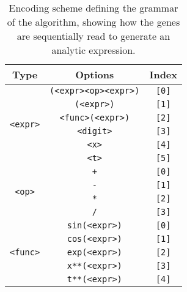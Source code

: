 \documentclass[multicolumn, 12pt]{extarticle}
\begin{document}
\begin{table}[h]
\centering
    \caption{Encoding scheme defining the grammar of the algorithm, showing how the genes are sequentially read to generate an analytic expression.}
    \label{tab:grammar}  
        \begin{tabular}{ccc}
        \toprule
        Type & Options & Index \\
        \midrule
             
             \multirow{6}{*}{\texttt{<expr>}} 
             		& \multicolumn{1}{c}{\texttt{(<expr><op><expr>)}} & \multicolumn{1}{c}{\texttt{[0]}} \\
                                & \multicolumn{1}{c}{\texttt{(<expr>)}} & \multicolumn{1}{c}{\texttt{[1]}} \\
                                & \multicolumn{1}{c}{\texttt{<func>(<expr>)}} & \multicolumn{1}{c}{\texttt{[2]}} \\
                                & \multicolumn{1}{c}{\texttt{<digit>}} & \multicolumn{1}{c}{\texttt{[3]}} \\
                                & \multicolumn{1}{c}{\texttt{<x>}} & \multicolumn{1}{c}{\texttt{[4]}} \\
                                & \multicolumn{1}{c}{\texttt{<t>}} & \multicolumn{1}{c}{\texttt{[5]}} \\                        
                                 
	\midrule
        
            \multirow{4}{*}{\texttt{<op>}} 
            		& \multicolumn{1}{c}{\texttt{+}} & \multicolumn{1}{c}{\texttt{[0]}} \\
                                & \multicolumn{1}{c}{\texttt{-}} & \multicolumn{1}{c}{\texttt{[1]}} \\
                                & \multicolumn{1}{c}{\texttt{*}} & \multicolumn{1}{c}{\texttt{[2]}} \\
                                & \multicolumn{1}{c}{\texttt{/}} & \multicolumn{1}{c}{\texttt{[3]}} \\
                                
	\midrule
        
            \multirow{5}{*}{\texttt{<func>}} 
                                & \multicolumn{1}{c}{\texttt{sin(<expr>)}} & \multicolumn{1}{c}{\texttt{[0]}} \\
                                & \multicolumn{1}{c}{\texttt{cos(<expr>)}} & \multicolumn{1}{c}{\texttt{[1]}} \\
                                & \multicolumn{1}{c}{\texttt{exp(<expr>)}} & \multicolumn{1}{c}{\texttt{[2]}} \\
                                & \multicolumn{1}{c}{\texttt{x**(<expr>)}} & \multicolumn{1}{c}{\texttt{[3]}} \\
                                & \multicolumn{1}{c}{\texttt{t**(<expr>)}} & \multicolumn{1}{c}{\texttt{[4]}} \\


\end{tabular}
\end{table}
\end{document}
